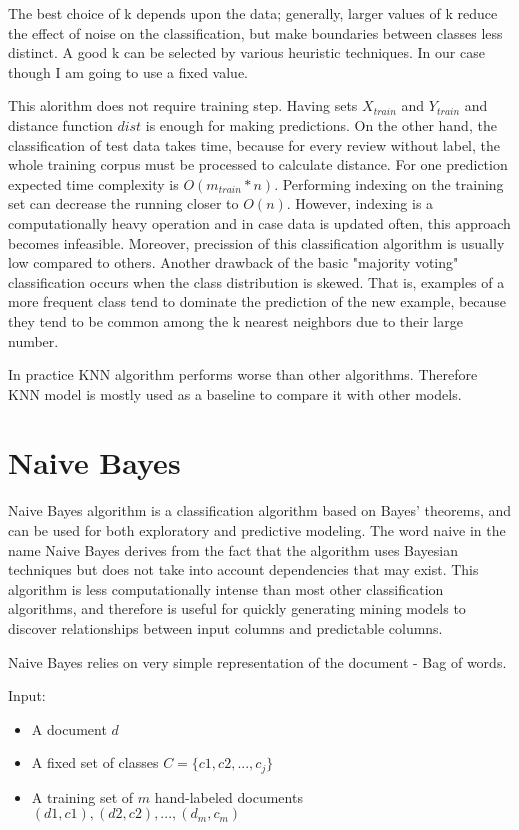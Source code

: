 \documentclass[12pt]{report}
\begin{document}
The best choice of k depends upon the data; generally, larger values of k reduce the effect of noise on the classification, but make boundaries between classes less distinct. A good k can be selected by various heuristic techniques. In our case though I am going to use a fixed value.

This alorithm does not require training step. Having sets $X_{train}$ and $Y_{train}$ and distance function $dist$ is enough for making predictions. On the other hand, the classification of test data takes time, because for every review without label, the whole training corpus must be processed to calculate distance. For one prediction expected time complexity is $O(m_{train} * n)$. Performing indexing on the training set can decrease the running closer to $O(n)$. However, indexing is a computationally heavy operation and in case data is updated often, this approach becomes infeasible. Moreover, precission of this classification algorithm is usually low compared to others. Another drawback of the basic "majority voting" classification occurs when the class distribution is skewed. That is, examples of a more frequent class tend to dominate the prediction of the new example, because they tend to be common among the k nearest neighbors due to their large number.

In practice KNN algorithm performs worse than other algorithms. Therefore KNN model is mostly used as a baseline to compare it with other models.

\newpage

\section{Naive Bayes}

Naive Bayes algorithm is a classification algorithm based on Bayes' theorems, and can be used for both exploratory and predictive modeling. The word naive in the name Naive Bayes derives from the fact that the algorithm uses Bayesian techniques but does not take into account dependencies that may exist. This algorithm is less computationally intense than most other classification algorithms, and therefore is useful for quickly generating mining models to discover relationships between input columns and predictable columns.

Naive Bayes relies on very simple representation of the document - Bag of words.

Input:

\begin{itemize}
  \item A document $d$
  \item A fixed set of classes $C=\{c1, c2,..., c_j\}$
  \item A training set of $m$ hand-labeled documents $(d1, c1), (d2, c2),..., (d_m, c_m)$
\end{itemize}
\end{document}
